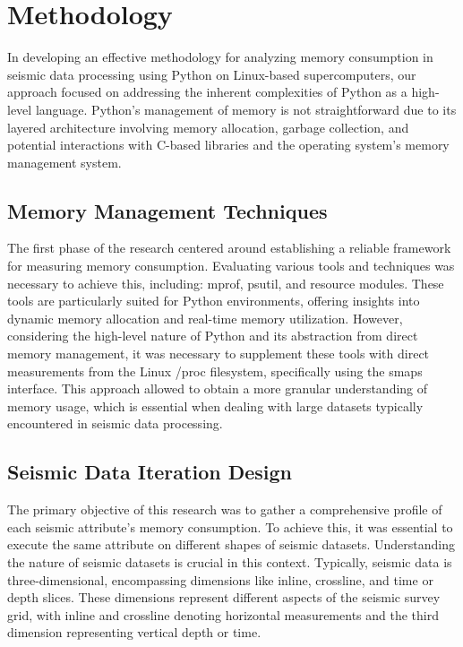 \section{Methodology}

In developing an effective methodology for analyzing memory consumption in seismic data processing using Python on Linux-based supercomputers, our approach focused on addressing the inherent complexities of Python as a high-level language.
Python's management of memory is not straightforward due to its layered architecture involving memory allocation, garbage collection, and potential interactions with C-based libraries and the operating system's memory management system.

\subsection{Memory Management Techniques}


The first phase of the research centered around establishing a reliable framework for measuring memory consumption.
Evaluating various tools and techniques was necessary to achieve this, including: mprof, psutil, and resource modules.
These tools are particularly suited for Python environments, offering insights into dynamic memory allocation and real-time memory utilization.
However, considering the high-level nature of Python and its abstraction from direct memory management, it was necessary to supplement these tools with direct measurements from the Linux /proc filesystem, specifically using the smaps interface.
This approach allowed to obtain a more granular understanding of memory usage, which is essential when dealing with large datasets typically encountered in seismic data processing.

\subsection{Seismic Data Iteration Design}

The primary objective of this research was to gather a comprehensive profile of each seismic attribute's memory consumption.
To achieve this, it was essential to execute the same attribute on different shapes of seismic datasets.
Understanding the nature of seismic datasets is crucial in this context.
Typically, seismic data is three-dimensional, encompassing dimensions like inline, crossline, and time or depth slices.
These dimensions represent different aspects of the seismic survey grid, with inline and crossline denoting horizontal measurements and the third dimension representing vertical depth or time.

